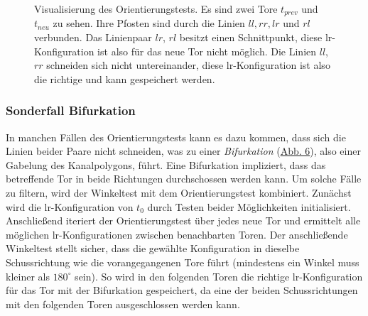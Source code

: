 \begin{figure}[h]
\centering
\label{fig:orientierungstest}
\caption{Visualisierung des Orientierungstests. Es sind zwei Tore \(t_{prev}\) und \(t_{neu}\) zu sehen. Ihre Pfosten sind durch die Linien \(ll, rr, lr\) und \(rl\) verbunden. Das Linienpaar \(lr\), \(rl\) besitzt einen Schnittpunkt, diese lr-Konfiguration ist also für das neue Tor nicht möglich. Die Linien \(ll\), \(rr\) schneiden sich nicht untereinander, diese lr-Konfiguration ist also die richtige und kann gespeichert werden.}
\end{figure}


\subsubsection{Sonderfall Bifurkation}
\label{sec:ende_punkt_1}
In manchen Fällen des Orientierungstests kann es dazu kommen, dass sich die Linien beider Paare nicht schneiden, was zu einer \emph{Bifurkation} (\hyperref[fig:bifurkation]{Abb. 6}), also einer Gabelung des Kanalpolygons, führt. Eine Bifurkation impliziert, dass das betreffende Tor in beide Richtungen durchschossen werden kann. Um solche Fälle zu filtern, wird der Winkeltest mit dem Orientierungstest kombiniert. Zunächst wird die lr-Konfiguration von \(t_0\) durch Testen beider Möglichkeiten initialisiert. Anschließend iteriert der Orientierungstest über jedes neue Tor und ermittelt alle möglichen lr-Konfigurationen zwischen benachbarten Toren. Der anschließende Winkeltest stellt sicher, dass die gewählte Konfiguration in dieselbe Schussrichtung wie die vorangegangenen Tore führt (mindestens ein Winkel muss kleiner als \(180^\circ\) sein). So wird in den folgenden Toren die richtige lr-Konfiguration für das Tor mit der Bifurkation gespeichert, da eine der beiden Schussrichtungen mit den folgenden Toren ausgeschlossen werden kann.

